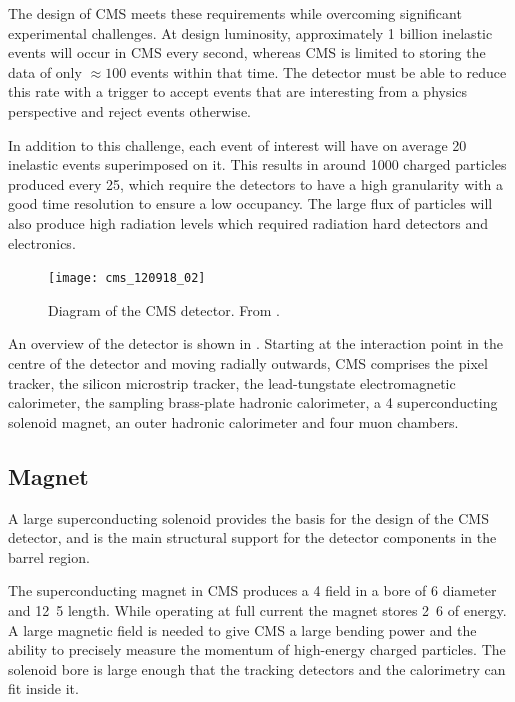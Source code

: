 The design of CMS meets these requirements while overcoming significant
experimental challenges.  At design luminosity, approximately 1 billion
inelastic events will occur in CMS every second, whereas CMS is limited to
storing the data of only $\approx 100 $ events within that time.  The detector
must be able to reduce this rate with a trigger to accept events that are
interesting from a physics perspective and reject events otherwise.

In addition to this challenge, each event of interest will have on average 20
inelastic events superimposed on it. This results in around 1000 charged
particles produced every \unit{25}{\ns}, which require the detectors to
have a high granularity with a good time resolution to ensure a low occupancy.
The large flux of particles will also produce high radiation levels which 
required radiation hard detectors and electronics.

\begin{figure}[htbp]
  \centering
  \texttt{[image: cms\_120918\_02]}
  \caption[Diagram of the CMS detector.] {Diagram of the CMS detector. From
\cite{SketchUpCMSGallery}.}
  \label{fig:CMSnc}
\end{figure}

An overview of the detector is shown in .  Starting at the
interaction point in the centre of the detector and moving radially outwards,
CMS comprises the pixel tracker, the silicon microstrip tracker, the
lead-tungstate electromagnetic calorimeter, the sampling brass-plate hadronic
calorimeter, a \unit{4}{\tesla} superconducting solenoid magnet, an outer
hadronic calorimeter and four muon chambers.


\subsection{Magnet}
A large superconducting solenoid provides the basis for the design of the CMS
detector, and is the main structural support for the detector components in the
barrel region.

The superconducting magnet in CMS produces a \unit{4}{\tesla} field in a bore of
\unit{6}{\meter} diameter and \unit{12.5}{\meter} length.  While operating at
full current the magnet stores \unit{2.6}{\giga\joule} of energy.  A large
magnetic field is needed to give CMS a large bending power and the ability to
precisely measure the momentum of high-energy charged particles.  The solenoid
bore is large enough that the tracking detectors and the calorimetry can fit
inside it\cite{chatrchyan2008cms}.

